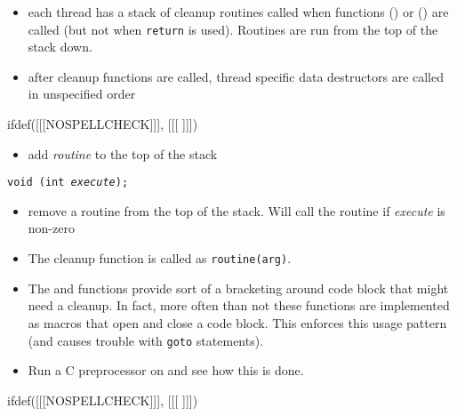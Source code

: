 \begin{slide}
\begin{itemize}
\item each thread has a stack of cleanup routines called when functions
() or () are called (but not when
\texttt{return} is used).  Routines are run from the top of the stack down.
\item after cleanup functions are called, thread specific data destructors are
called in unspecified order
\end{itemize}
ifdef([[[NOSPELLCHECK]]], [[[
]]])
\begin{itemize}
\item add \emph{routine} to the top of the stack
\end{itemize}
\texttt{void (int \emph{execute});}
\begin{itemize}
\item remove a routine from the top of the stack.  Will call the routine if
\emph{execute} is non-zero
\end{itemize}
\end{slide}


\begin{itemize}
\item The cleanup function is called as \texttt{routine(arg)}.
\item The  and 
functions provide sort of a bracketing around code block that might need a
cleanup. In fact, more often than not these functions are implemented as macros
that open and close a code block. This enforces this usage pattern
(and causes trouble with \texttt{goto} statements).
\item Run a C preprocessor on  and see how
this is done.
\end{itemize}


ifdef([[[NOSPELLCHECK]]], [[[
]]])

